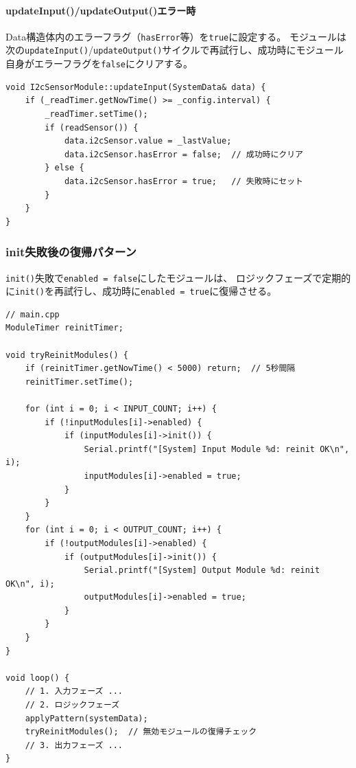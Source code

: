 \paragraph{updateInput()/updateOutput()エラー時}
Data構造体内のエラーフラグ（\texttt{hasError}等）を\texttt{true}に設定する。
モジュールは次の\texttt{updateInput()}/\texttt{updateOutput()}サイクルで再試行し、成功時にモジュール自身がエラーフラグを\texttt{false}にクリアする。

\begin{lstlisting}[style=cppstyle, caption={updateInput()エラーフラグの運用例}]
void I2cSensorModule::updateInput(SystemData& data) {
    if (_readTimer.getNowTime() >= _config.interval) {
        _readTimer.setTime();
        if (readSensor()) {
            data.i2cSensor.value = _lastValue;
            data.i2cSensor.hasError = false;  // 成功時にクリア
        } else {
            data.i2cSensor.hasError = true;   // 失敗時にセット
        }
    }
}
\end{lstlisting}

\subsubsection{init失敗後の復帰パターン}

\texttt{init()}失敗で\texttt{enabled = false}にしたモジュールは、
ロジックフェーズで定期的に\texttt{init()}を再試行し、成功時に\texttt{enabled = true}に復帰させる。

\begin{lstlisting}[style=cppstyle, caption={ロジックフェーズでのinit復帰パターン}]
// main.cpp
ModuleTimer reinitTimer;

void tryReinitModules() {
    if (reinitTimer.getNowTime() < 5000) return;  // 5秒間隔
    reinitTimer.setTime();

    for (int i = 0; i < INPUT_COUNT; i++) {
        if (!inputModules[i]->enabled) {
            if (inputModules[i]->init()) {
                Serial.printf("[System] Input Module %d: reinit OK\n", i);
                inputModules[i]->enabled = true;
            }
        }
    }
    for (int i = 0; i < OUTPUT_COUNT; i++) {
        if (!outputModules[i]->enabled) {
            if (outputModules[i]->init()) {
                Serial.printf("[System] Output Module %d: reinit OK\n", i);
                outputModules[i]->enabled = true;
            }
        }
    }
}

void loop() {
    // 1. 入力フェーズ ...
    // 2. ロジックフェーズ
    applyPattern(systemData);
    tryReinitModules();  // 無効モジュールの復帰チェック
    // 3. 出力フェーズ ...
}
\end{lstlisting}

